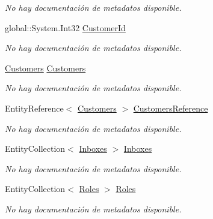 \begin{DoxyCompactItemize}
\begin{DoxyCompactList}\small\item\em No hay documentación de metadatos disponible. \end{DoxyCompactList}\item 
global\-::\-System.\-Int32 \hyperlink{class_microsoft_1_1_samples_1_1_kinect_1_1_basic_interactions_1_1_users_aa62f5445d23af9dce96fc63f89ab9d7c}{Customer\-Id}
\begin{DoxyCompactList}\small\item\em No hay documentación de metadatos disponible. \end{DoxyCompactList}\item 
\hyperlink{class_microsoft_1_1_samples_1_1_kinect_1_1_basic_interactions_1_1_customers}{Customers} \hyperlink{class_microsoft_1_1_samples_1_1_kinect_1_1_basic_interactions_1_1_users_a4e38a3fd863bd393aa366e2b32456fee}{Customers}
\begin{DoxyCompactList}\small\item\em No hay documentación de metadatos disponible. \end{DoxyCompactList}\item 
Entity\-Reference$<$ \hyperlink{class_microsoft_1_1_samples_1_1_kinect_1_1_basic_interactions_1_1_customers}{Customers} $>$ \hyperlink{class_microsoft_1_1_samples_1_1_kinect_1_1_basic_interactions_1_1_users_ac2822ab9388d38e3fe31d66841b99e30}{Customers\-Reference}
\begin{DoxyCompactList}\small\item\em No hay documentación de metadatos disponible. \end{DoxyCompactList}\item 
Entity\-Collection$<$ \hyperlink{class_microsoft_1_1_samples_1_1_kinect_1_1_basic_interactions_1_1_inboxes}{Inboxes} $>$ \hyperlink{class_microsoft_1_1_samples_1_1_kinect_1_1_basic_interactions_1_1_users_aab16b6d5d617b896adb7f97fd6cf4071}{Inboxes}
\begin{DoxyCompactList}\small\item\em No hay documentación de metadatos disponible. \end{DoxyCompactList}\item 
Entity\-Collection$<$ \hyperlink{class_microsoft_1_1_samples_1_1_kinect_1_1_basic_interactions_1_1_roles}{Roles} $>$ \hyperlink{class_microsoft_1_1_samples_1_1_kinect_1_1_basic_interactions_1_1_users_acfe6810d292d87a17243c703e892edd8}{Roles}
\begin{DoxyCompactList}\small\item\em No hay documentación de metadatos disponible. \end{DoxyCompactList}\end{DoxyCompactItemize}


